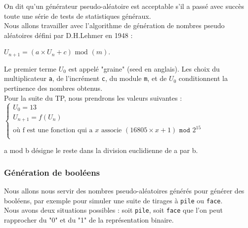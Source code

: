 


On dit qu'un générateur pseudo-aléatoire est acceptable s'il a passé avec succès toute une série de tests de statistiques généraux.\\

Nous allons travailler avec l'algorithme de génération de nombres pseudo aléatoires défini par D.H.Lehmer en 1948 : 
\begin{center}
$U_{n+1}=(a \times U_n+c)\text{ mod }(m)$.
\end{center}
Le premier terme $U_0$ est appelé "graine" (seed en anglais). Les choix du multiplicateur \texttt{a}, de l'incrément \texttt{c}, du module \texttt{m}, et de $U_0$ conditionnent la pertinence des nombres obtenus.\\

Pour la suite du TP, nous prendrons les valeurs suivantes :
$\left\{ \begin{array}{l}
   U_0=13  \\
   U_{n+1}=f( U_{n})\\
\mbox{où f est une fonction qui a } x \mbox{ associe }
(16805 \times x+1)\texttt{ mod }2^{15}  \\
\end{array} \right.$

\begin{center}
a mod b désigne le reste dans la division euclidienne de a par b.
\end{center}







\subsubsection*{Génération de booléens}
Nous allons nous servir des nombres pseudo-aléatoires générés pour générer des booléens, par exemple pour simuler une suite de tirages à \texttt{pile} ou \texttt{face}.\\
Nous avons deux situations possibles : soit \texttt{pile}, soit \texttt{face} que l'on peut rapprocher du "0" et du "1" de la représentation binaire.

